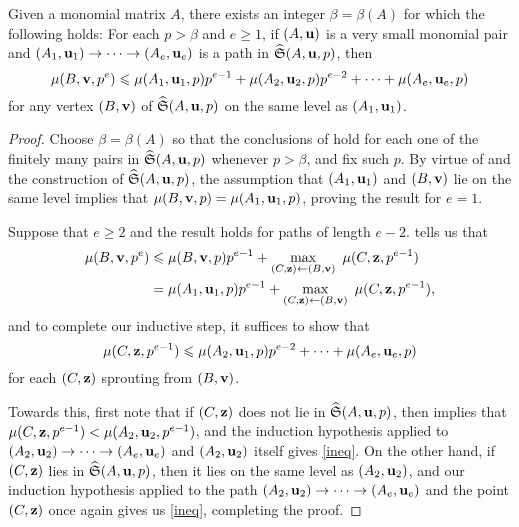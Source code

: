 \documentclass[11pt]{amsart}
\begin{document}
\begin{lemma}\label{lem: upper bound for higher mu}
   Given a monomial matrix $A$, there exists an integer $\beta= \beta(A)$ for which the following holds\textup:
   For each $p>\beta$ and $e\ge 1$, if $(A, \mathbf{u})$ is a very small monomial pair and $(A_1, \mathbf{u}_1) \to \cdots \to (A_e, \mathbf{u}_e)$ is a path in $\widehat{\mathfrak{S}}(A, \mathbf{u}, p)$,  then 
   \[
      \mu(B, \mathbf{v}, p^e) \leqslant \mu(A_1, \mathbf{u}_1, p)p^{e-1} + \mu(A_2, \mathbf{u}_2, p)p^{e-2} + \cdots + \mu(A_{e}, \mathbf{u}_{e}, p)
   \]
   for any vertex $(B, \mathbf{v})$ of $\widehat{\mathfrak{S}}(A, \mathbf{u}, p)$ on the same level as $(A_1, \mathbf{u}_1)$.
\end{lemma}

\begin{proof}
   Choose $\beta = \beta(A)$ so that the conclusions of   hold for each one of the finitely many pairs in $\widehat{\mathfrak{S}}(A, \mathbf{u},p)$ whenever $p > \beta$, and fix such $p$.
    By virtue of  and the construction of $\widehat{\mathfrak{S}}(A,\mathbf{u},p)$, the assumption that $(A_1, \mathbf{u}_1)$ and $(B, \mathbf{v})$ lie on the same level implies that $\mu(B,\mathbf{v},p) = \mu(A_1, \mathbf{u}_1, p)$, proving the result for $e = 1$.

    Suppose that $e \geq 2$ and the result holds for paths of length $e-2$.
     tells us that
    \begin{align*}
      \mu(B,\mathbf{v},p^e) &\leqslant \mu(B,\mathbf{v},p) p^{e-1} + \max_{(C,\mathbf{z}) \leftarrow (B,\mathbf{v})} \ \mu(C,\mathbf{z},p^{e-1}) \\
      &= \mu(A_1,\mathbf{u}_1,p) p^{e-1} + \max_{(C,\mathbf{z}) \leftarrow (B,\mathbf{v})} \ \mu(C,\mathbf{z},p^{e-1}),
    \end{align*}
    and to complete our inductive step, it suffices to show that
    \begin{equation}\label{ineq}
        \mu(C,\mathbf{z},p^{e-1}) \leqslant \mu(A_2,\mathbf{u}_1,p) p^{e-2} + \cdots + \mu(A_e,\mathbf{u}_e,p)
    \end{equation}
    for each $(C,\mathbf{z})$ sprouting from $(B,\mathbf{v})$.
    
    Towards this, first note that if $(C, \mathbf{z})$ does not lie in $\widehat{\mathfrak{S}}(A,\mathbf{u},p)$, then  implies that $\mu(C, \mathbf{z},p^{e-1}) < \mu(A_2,\mathbf{u}_2, p^{e-1})$, and the induction hypothesis applied to $(A_2, \mathbf{u}_2) \to \cdots \to (A_e, \mathbf{u}_e)$ and $(A_2,\mathbf{u}_2)$ itself gives \eqref{ineq}.
    On the other hand, if $(C, \mathbf{z})$ lies in $\widehat{\mathfrak{S}}(A, \mathbf{u},p)$, then it lies on the same level as $(A_2, \mathbf{u}_2)$, and  our induction hypothesis applied to the path $(A_2, \mathbf{u}_2) \to \cdots \to (A_e, \mathbf{u}_e)$ and the point $(C, \mathbf{z})$ once again gives us \eqref{ineq}, completing the proof.
\end{proof}
\end{document}
